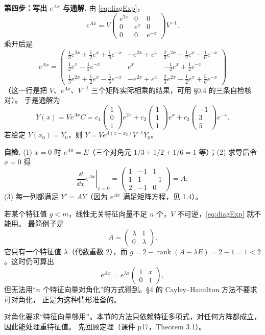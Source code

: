 \documentclass[11pt]{ctexart}
\newcommand{\pmat}[1]{\begin{pmatrix}#1\end{pmatrix}}
\begin{document}
\textbf{第四步：写出 $e^{Ax}$ 与通解.} 由 \eqref{eq:diagExp}，
\[
e^{Ax}=V\pmat{e^{2x}&0&0\\0&e^{x}&0\\0&0&e^{-x}}V^{-1}.
\]
乘开后是
\[
e^{Ax}=
\pmat{
\frac13e^{2x}+\frac12e^{x}+\frac16e^{-x} &
-e^{2x}+e^{x} &
\frac23e^{2x}-\frac12e^{x}-\frac16e^{-x}\\[4pt]
\frac12e^{x}-\frac12e^{-x} & e^{x} & -\frac12e^{x}+\frac12e^{-x}\\[4pt]
\frac13e^{2x}+\frac12e^{x}-\frac56e^{-x} &
-e^{2x}+e^{x} &
\frac23e^{2x}-\frac12e^{x}+\frac56e^{-x}}
\]
（这一行是把 $V$、$e^{\Lambda x}$、$V^{-1}$ 三个矩阵实际相乘的结果，可用 §0.4 的三条自检核对）。
于是通解为
\[
Y(x)=Ve^{\Lambda x}C
=c_1\pmat{1\\0\\1}e^{2x}+c_2\pmat{1\\1\\1}e^{x}+c_3\pmat{-1\\3\\5}e^{-x}.
\]
若给定 $Y(x_0)=Y_0$，则 $Y=Ve^{\Lambda(x-x_0)}V^{-1}Y_0$。

\textbf{自检.} (1) $x=0$ 时 $e^{A0}=E$（三个对角元 $1/3+1/2+1/6=1$ 等）；(2) 求导后令 $x=0$ 得
\[
\left.\frac{\dd}{\dd x}e^{Ax}\right|_{x=0}
=\pmat{1&-1&1\\1&1&-1\\2&-1&0}=A;
\]
(3) 每一列都满足 $Y'=AY$（因为 $e^{Ax}$ 满足矩阵方程，见 1.4）。


若某个特征值 $g<m$，线性无关特征向量不足 $n$ 个，$V$ 不可逆，\eqref{eq:diagExp} 就不能用。
最简例子是
\[
A=\pmat{\lambda&1\\0&\lambda}.
\]
它只有一个特征值 $\lambda$（代数重数 2），而
$g=2-\operatorname{rank}(A-\lambda E)=2-1=1<2$。这时仍可算出
\[
e^{Ax}=e^{\lambda x}\pmat{1&x\\0&1},
\]
但无法用“$n$ 个特征向量对角化”的方式得到。§4 的 Cayley--Hamilton 方法不要求可对角化，
正是为这种情形准备的。

\flowerrule



对角化要求“特征向量够用”。本节的方法只依赖特征多项式，对任何方阵都成立，因此能处理重特征值。
先回顾定理（课件 p17，Theorem 3.1）。
\end{document}
